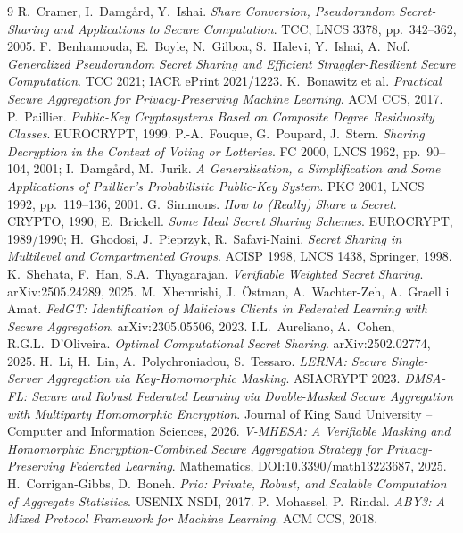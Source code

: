 \documentclass[11pt]{article}
\begin{document}
\begin{thebibliography}{9}
 R.~Cramer, I.~Damgård, Y.~Ishai. \emph{Share Conversion,
  Pseudorandom Secret-Sharing and Applications to Secure Computation}. TCC, LNCS
  3378, pp.~342--362, 2005.
 F.~Benhamouda, E.~Boyle, N.~Gilboa, S.~Halevi,
  Y.~Ishai, A.~Nof. \emph{Generalized Pseudorandom Secret Sharing and Efficient
  Straggler-Resilient Secure Computation}. TCC 2021; IACR ePrint 2021/1223.
 K.~Bonawitz et al. \emph{Practical Secure Aggregation for
  Privacy-Preserving Machine Learning}. ACM CCS, 2017.
 P.~Paillier. \emph{Public-Key Cryptosystems Based on
  Composite Degree Residuosity Classes}. EUROCRYPT, 1999.
 P.-A.~Fouque, G.~Poupard, J.~Stern. \emph{Sharing
  Decryption in the Context of Voting or Lotteries}. FC 2000, LNCS 1962,
  pp.~90--104, 2001; I.~Damgård, M.~Jurik. \emph{A Generalisation, a
  Simplification and Some Applications of Paillier's Probabilistic Public-Key
  System}. PKC 2001, LNCS 1992, pp.~119--136, 2001.
 G.~Simmons. \emph{How to (Really) Share a Secret}.
  CRYPTO, 1990; E.~Brickell. \emph{Some Ideal Secret Sharing Schemes}. EUROCRYPT,
  1989/1990; H.~Ghodosi, J.~Pieprzyk, R.~Safavi-Naini. \emph{Secret Sharing in
  Multilevel and Compartmented Groups}. ACISP 1998, LNCS 1438, Springer, 1998.
 K.~Shehata, F.~Han, S.A.~Thyagarajan. \emph{Verifiable Weighted
  Secret Sharing}. arXiv:2505.24289, 2025.
 M.~Xhemrishi, J.~Östman, A.~Wachter-Zeh, A.~Graell i Amat.
  \emph{FedGT: Identification of Malicious Clients in Federated Learning with
  Secure Aggregation}. arXiv:2305.05506, 2023.
 I.L.~Aureliano, A.~Cohen, R.G.L.~D'Oliveira. \emph{Optimal
  Computational Secret Sharing}. arXiv:2502.02774, 2025.
 H.~Li, H.~Lin, A.~Polychroniadou, S.~Tessaro. \emph{LERNA:
  Secure Single-Server Aggregation via Key-Homomorphic Masking}. ASIACRYPT 2023.
 \emph{DMSA-FL: Secure and Robust Federated Learning via
  Double-Masked Secure Aggregation with Multiparty Homomorphic Encryption}.
  Journal of King Saud University -- Computer and Information Sciences, 2026.
 \emph{V-MHESA: A Verifiable Masking and Homomorphic
  Encryption-Combined Secure Aggregation Strategy for Privacy-Preserving
  Federated Learning}. Mathematics, DOI:10.3390/math13223687, 2025.
 H.~Corrigan-Gibbs, D.~Boneh. \emph{Prio: Private, Robust, and
  Scalable Computation of Aggregate Statistics}. USENIX NSDI, 2017.
 P.~Mohassel, P.~Rindal. \emph{ABY3: A Mixed Protocol
  Framework for Machine Learning}. ACM CCS, 2018.
\end{thebibliography}
\end{document}

